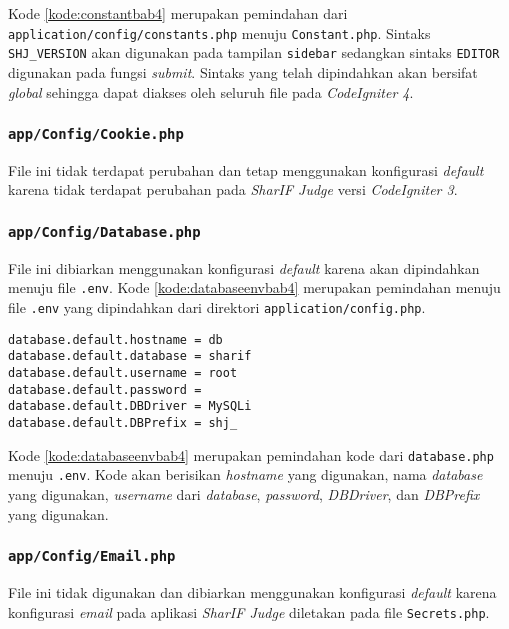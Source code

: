 Kode \ref{kode:constantbab4} merupakan pemindahan dari \texttt{application/config/constants.php} menuju \texttt{Constant.php}. Sintaks \texttt{SHJ\_VERSION} akan digunakan pada tampilan \texttt{sidebar} sedangkan sintaks \texttt{EDITOR} digunakan pada fungsi \textit{submit}. Sintaks yang telah dipindahkan akan bersifat \textit{global} sehingga dapat diakses oleh seluruh file pada \textit{CodeIgniter 4}.

\subsubsection{\texttt{app/Config/Cookie.php}}
File ini tidak terdapat perubahan dan tetap menggunakan konfigurasi \textit{default} karena tidak terdapat perubahan pada \textit{SharIF Judge} versi \textit{CodeIgniter 3}.

\subsubsection{\texttt{app/Config/Database.php}}
File ini dibiarkan menggunakan konfigurasi \textit{default} karena akan dipindahkan menuju file \texttt{.env}. Kode \ref{kode:databaseenvbab4} merupakan pemindahan menuju file \texttt{.env} yang dipindahkan dari direktori \texttt{application/config.php}.

\begin{lstlisting}[caption=Pemindahan \texttt{app/config/database.php} menuju \texttt{.env}, label=kode:databaseenvbab4]
database.default.hostname = db
database.default.database = sharif
database.default.username = root
database.default.password = 
database.default.DBDriver = MySQLi
database.default.DBPrefix = shj_
\end{lstlisting}

Kode \ref{kode:databaseenvbab4} merupakan pemindahan kode dari \texttt{database.php} menuju \texttt{.env}. Kode akan berisikan \textit{hostname} yang digunakan, nama \textit{database} yang digunakan, \textit{username} dari \textit{database}, \textit{password}, \textit{DBDriver}, dan \textit{DBPrefix} yang digunakan.

\subsubsection{\texttt{app/Config/Email.php}}
File ini tidak digunakan dan dibiarkan menggunakan konfigurasi \textit{default} karena konfigurasi \textit{email} pada aplikasi \textit{SharIF Judge} diletakan pada file \texttt{Secrets.php}.

